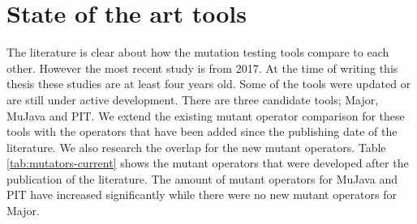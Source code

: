 \documentclass[../main]{subfiles}
\begin{document}
\section{State of the art tools}
The literature is clear about how the mutation testing tools compare to each other.
However the most recent study is from 2017.
At the time of writing this thesis these studies are at least four years old. 
Some of the tools were updated or are still under active development\cite{pit-releases,Major}.
\newline
There are three candidate tools; Major, MuJava and PIT.
We extend the existing mutant operator comparison for these tools with the operators that have been added since the publishing date of the literature.
We also research the overlap for the new mutant operators.
Table \ref{tab:mutators-current} shows the mutant operators that were developed after the publication of the literature. The amount of mutant operators for  MuJava and PIT have increased significantly while there were no new mutant operators for Major.
\end{document}
